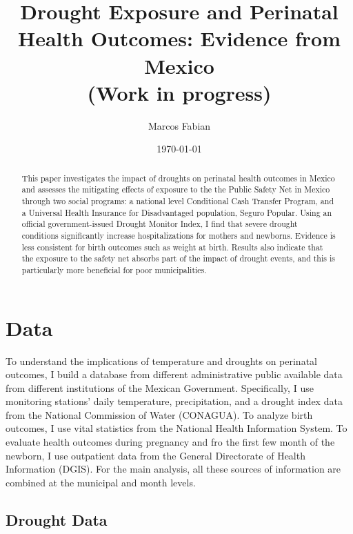 \documentclass[12pt, oneside]{article}      %
\title{{Drought Exposure and Perinatal Health Outcomes: Evidence from Mexico} \vspace{1cm} \\ \large{(Work in progress)}}
\author{Marcos Fabian}
\date{\today}
\begin{document}
\maketitle



\begin{abstract}

This paper investigates the impact of droughts on perinatal health outcomes in Mexico and assesses the mitigating effects of exposure to the the Public Safety Net in Mexico through two social programs: a national level Conditional Cash Transfer Program, and a Universal Health Insurance for Disadvantaged population, Seguro Popular. Using an official government-issued Drought Monitor Index, I find that severe drought conditions significantly increase hospitalizations for mothers and newborns. Evidence is less consistent for birth outcomes such as weight at birth. Results also indicate that the exposure to the safety net absorbs part of the impact of drought events, and this is particularly more beneficial for poor municipalities.


\end{abstract}

\clearpage
\newpage




\section{Data}

To understand the implications of temperature and droughts on perinatal outcomes, I build a database from different administrative public available data from different institutions of the Mexican Government. Specifically, I use monitoring stations' daily temperature, precipitation, and a drought index data from the National Commission of Water (CONAGUA). To analyze birth outcomes, I use vital statistics from the National Health Information System. To evaluate health outcomes during pregnancy and fro the first few month of the newborn, I use outpatient data from the General Directorate of Health Information (DGIS). For the main analysis, all these sources of information are combined at the municipal and month levels. 

\subsection{Drought Data}
\end{document}
